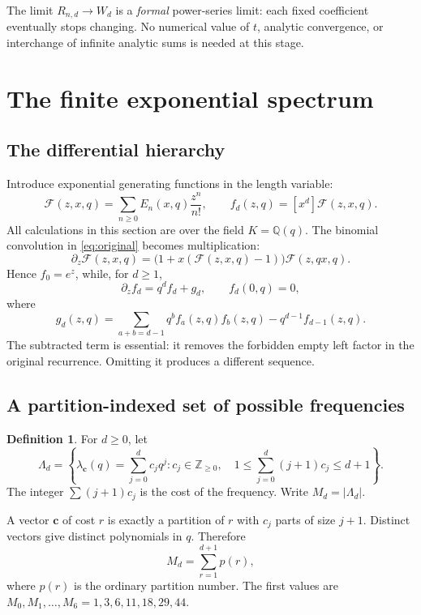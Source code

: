 \documentclass[11pt,letterpaper]{article}
\numberwithin{equation}{section}
\theoremstyle{definition}
\newtheorem{definition}[theorem]{Definition}
\theoremstyle{remark}
\newcommand{\Q}{\mathbb Q}
\newcommand{\Z}{\mathbb Z}
\newcommand{\Spec}{\Lambda}
\begin{document}
The limit $R_{n,d}\to W_d$ is a \emph{formal} power-series limit:
each fixed coefficient eventually stops changing. No numerical value of
$t$, analytic convergence, or interchange of infinite analytic sums is
needed at this stage.

\section{The finite exponential spectrum}\label{sec:spectrum}
\subsection{The differential hierarchy}
Introduce exponential generating functions in the length variable:
\begin{equation}\label{eq:egf}
 \mathcal F(z,x,q)=\sum_{n\ge0}E_n(x,q)\frac{z^n}{n!},\qquad
 f_d(z,q)=[x^d]\mathcal F(z,x,q).
\end{equation}
All calculations in this section are over the field $K=\Q(q)$.
The binomial convolution in \eqref{eq:original} becomes multiplication:
\begin{equation}\label{eq:functionalegf}
 \partial_z\mathcal F(z,x,q)
 =\bigl(1+x(\mathcal F(z,x,q)-1)\bigr)\mathcal F(z,qx,q).
\end{equation}
Hence $f_0=e^z$, while, for $d\ge1$,
\begin{equation}\label{eq:ode}
 \partial_z f_d=q^d f_d+g_d,\qquad f_d(0,q)=0,
\end{equation}
where
\begin{equation}\label{eq:g}
 g_d(z,q)=\sum_{a+b=d-1}q^b f_a(z,q)f_b(z,q)
                    -q^{d-1}f_{d-1}(z,q).
\end{equation}
The subtracted term is essential: it removes the forbidden empty left
factor in the original recurrence. Omitting it produces a different
sequence.

\subsection{A partition-indexed set of possible frequencies}
\begin{definition}\label{def:spectrum}
For $d\ge0$, let
\begin{equation}\label{eq:spectrum}
 \Spec_d=\left\{
 \lambda_{\boldsymbol c}(q)=\sum_{j=0}^{d}c_jq^j:
 c_j\in\Z_{\ge0},\quad 1\le\sum_{j=0}^{d}(j+1)c_j\le d+1
 \right\}.
\end{equation}
The integer $\sum(j+1)c_j$ is the cost of the frequency.
Write $M_d=|\Spec_d|$.
\end{definition}
A vector $\boldsymbol c$ of cost $r$ is exactly a partition of $r$ with
$c_j$ parts of size $j+1$. Distinct vectors give distinct polynomials in
$q$. Therefore
\begin{equation}\label{eq:count}
 M_d=\sum_{r=1}^{d+1}p(r),
\end{equation}
where $p(r)$ is the ordinary partition number. The first values are
$M_0,M_1,\ldots,M_6=1,3,6,11,18,29,44$.
\end{document}

